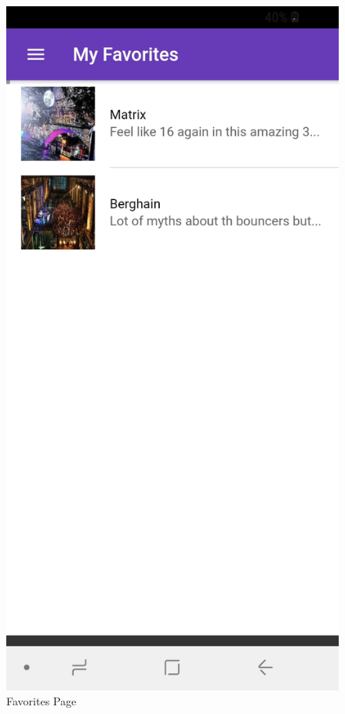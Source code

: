 \documentclass[12pt]{article}
\begin{document}
\begin{figure}[H]
\endminipage\hfill
{}
  \includegraphics[width=\linewidth]{figures/Favorites.jpg}
  \caption{Favorites Page}\label{fig:awesome_image2}
\endminipage\hfill
{}%

\end{figure}
\end{document}
